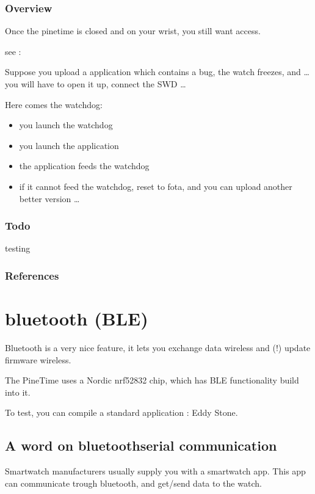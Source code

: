 \documentclass[letterpaper,10pt,english]{sphinxmanual}
\begin{document}
\subsection{Overview}
\label{\detokenize{drivers/watchdog:overview}}
Once the pinetime is closed and on your wrist, you still want access.

see : {\hyperref[\detokenize{fota/fota:fota}]{}}

Suppose you upload a application which contains a bug, the watch freezes, and … you will have to open it up, connect the SWD …

Here comes the watchdog:
\begin{itemize}
\item {} 
you launch the watchdog

\item {} 
you launch the application

\item {} 
the application feeds the watchdog

\item {} 
if it cannot feed the watchdog, reset to fota, and you can upload another better version …

\end{itemize}


\subsection{Todo}
\label{\detokenize{drivers/watchdog:todo}}
testing


\subsection{References}
\label{\detokenize{drivers/watchdog:references}}

\chapter{bluetooth (BLE)}
\label{\detokenize{bluetooth:bluetooth-ble}}\label{\detokenize{bluetooth::doc}}
Bluetooth is a very nice feature, it lets you exchange data wireless and (!) update firmware wireless.

The PineTime uses a Nordic nrf52832 chip, which has BLE functionality build into it.

To test, you can compile a standard application : Eddy Stone.


\section{A word on bluetooth\sphinxhyphen{}serial communication}
\label{\detokenize{bluetooth:a-word-on-bluetooth-serial-communication}}
Smartwatch manufacturers usually supply you with a smartwatch app.
This app can communicate trough bluetooth, and get/send data to the watch.
\end{document}
